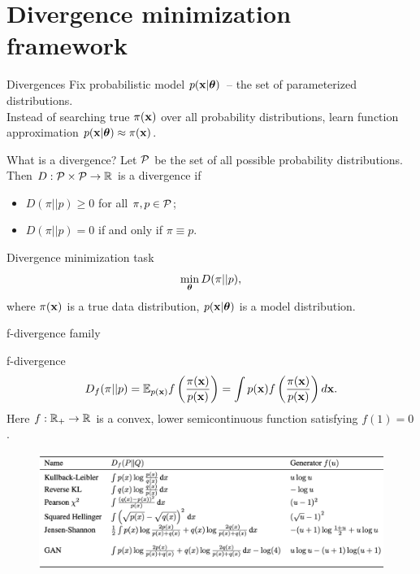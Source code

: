 \section{Divergence minimization framework}
\begin{frame}{Divergences}
	Fix probabilistic model $p(\mathbf{x} | \boldsymbol{\theta})$~-- the set of parameterized distributions. \\
	Instead of searching true $\pi(\mathbf{x})$ over all probability distributions, learn function approximation $p(\mathbf{x} | \boldsymbol{\theta}) \approx \pi(\mathbf{x})$.
	\begin{block}{What is a divergence?}
		Let $\mathcal{P}$ be the set of all possible probability distributions. Then $D: \mathcal{P} \times \mathcal{P} \rightarrow \mathbb{R}$ is a divergence if 
		\begin{itemize}
			\item $D(\pi || p) \geq 0$ for all $\pi, p \in \mathcal{P}$;
			\item $D(\pi || p) = 0$ if and only if $\pi \equiv p$.
		\end{itemize}
	\end{block}
	\begin{block}{Divergence minimization task}
		\vspace{-0.3cm}
		\[
		\min_{\boldsymbol{\theta}} D(\pi || p),
		\]
		where $\pi(\mathbf{x})$ is a true data distribution, $p(\mathbf{x} | \boldsymbol{\theta})$ is a model distribution.
	\end{block}
\end{frame}
\begin{frame}{f-divergence family}
	
	\begin{block}{f-divergence}
		\vspace{-0.3cm}
		\[
		D_f(\pi || p) = \mathbb{E}_{p(\mathbf{x})}  f\left( \frac{\pi(\mathbf{x})}{p(\mathbf{x})} \right)  = \int p(\mathbf{x}) f\left( \frac{\pi(\mathbf{x})}{p(\mathbf{x})} \right) d \mathbf{x}.
		\]
		Here $f: \mathbb{R}_+ \rightarrow \mathbb{R}$ is a convex, lower semicontinuous function satisfying $f(1) = 0$.
	\end{block}
	\begin{figure}
		\centering
		\includegraphics[width=\linewidth]{figs/f_divs}
	\end{figure}
\end{frame}
